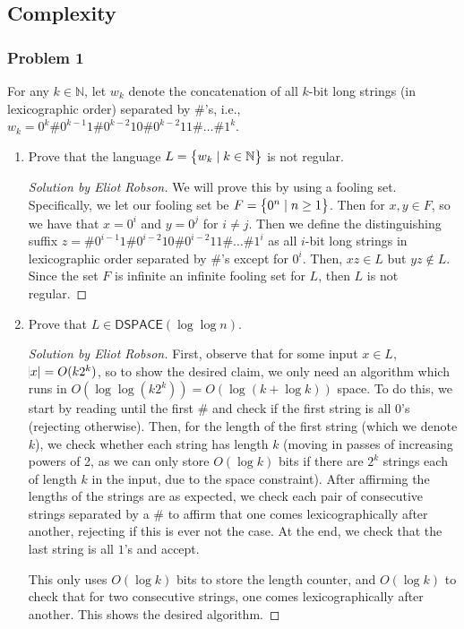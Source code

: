 \documentclass{article}
\newenvironment{solution}[1]{\begin{proof}[Solution by #1]}{\end{proof}}
\newcommand{\DSPACE}{\mathsf{DSPACE}}
\newcommand{\Naturals}{\mathbb{N}}
\begin{document}
\subsection{Complexity}

\subsubsection{Problem 1}
For any \(k \in \Naturals\), let \(w_k\) denote the concatenation of all \(k\)-bit long strings (in lexicographic order) separated by \(\#\)'s, i.e., \(w_k = 0^k \# 0^{k-1}1 \# 0^{k-2}10 \# 0^{k-2} 11 \# \dots \# 1^k\).

\begin{enumerate}
	\item Prove that the language \(L = \set{w_k \mid k \in \mathbb{N}}\) is not regular.
	
	\begin{solution}{Eliot Robson}
		We will prove this by using a fooling set. Specifically, we let our fooling set be \(F = \set{0^n \mid n \geq 1}\). Then for \(x,y \in F\),  so we have that \(x = 0^i\) and \(y = 0^j\) for \(i \neq j\). Then we define the distinguishing suffix \(z = \# 0^{i-1}1 \# 0^{i-2}10 \# 0^{i-2} 11 \# \dots \# 1^i\) as all \(i\)-bit long strings in lexicographic order separated by \(\#\)'s except for \(0^i\). Then, \(xz \in L\) but \(yz \notin L\). Since the set \(F\) is infinite an infinite fooling set for \(L\), then \(L\) is not regular.
	\end{solution}

	\item Prove that \(L \in \DSPACE(\log \log n)\).
	
	\begin{solution}{Eliot Robson}
		First, observe that for some input \(x \in L\), \(\abs{x} = O(k 2^k)\), so to show the desired claim, we only need an algorithm which runs in \(O(\log \log (k 2^k)) = O(\log (k + \log k))\) space. To do this, we start by reading until the first \(\#\) and check if the first string is all 0's (rejecting otherwise). Then, for the length of the first string (which we denote \(k\)), we check whether each string has length \(k\) (moving in passes of increasing powers of 2, as we can only store \(O(\log k)\) bits if there are \(2^k\) strings each of length \(k\) in the input, due to the space constraint). After affirming the lengths of the strings are as expected, we check each pair of consecutive strings separated by a \(\#\) to affirm that one comes lexicographically after another, rejecting if this is ever not the case. At the end, we check that the last string is all \(1\)'s and accept.
		
		This only uses \(O(\log k)\) bits to store the length counter, and \(O(\log k)\) to check that for two consecutive strings, one comes lexicographically after another. This shows the desired algorithm.
	\end{solution} 
\end{enumerate}
\end{document}
